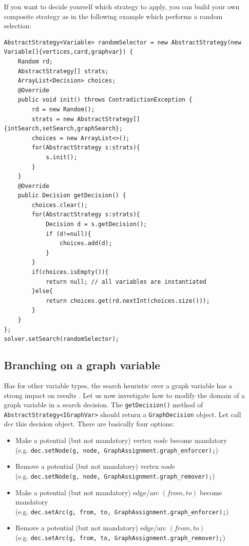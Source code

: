 \documentclass{article}
\begin{document}
If you want to decide yourself which strategy to apply, you can build your own composite strategy as in the following example which performs a random selection:

\begin{lstlisting}
AbstractStrategy<Variable> randomSelector = new AbstractStrategy(new Variable[]{vertices,card,graphvar}) {
	Random rd;
	AbstractStrategy[] strats;
	ArrayList<Decision> choices;
	@Override
	public void init() throws ContradictionException {
		rd = new Random();
		strats = new AbstractStrategy[]{intSearch,setSearch,graphSearch};
		choices = new ArrayList<>();
		for(AbstractStrategy s:strats){
			s.init();
		}
	}
	@Override
	public Decision getDecision() {
		choices.clear();
		for(AbstractStrategy s:strats){
			Decision d = s.getDecision();
			if (d!=null){
				choices.add(d);
			}
		}
		if(choices.isEmpty()){
			return null; // all variables are instantiated
		}else{
			return choices.get(rd.nextInt(choices.size()));
		}
	}
};
solver.setSearch(randomSelector);
\end{lstlisting}

\subsection{Branching on a graph variable}

Has for other variable types, the search heuristic over a graph variable has a strong impact on results \cite{GraphSearch}. 
Let us now investigate how to modify the domain of a graph variable in a search decision. 
The \texttt{getDecision()} method of \texttt{AbstractStrategy<IGraphVar>} should return a \texttt{GraphDecision} object. Let call $dec$ this decision object. 
There are basically four options:
\begin{itemize} 
\item Make a potential (but not mandatory) vertex $node$ become mandatory \\ 
(e.g. \texttt{dec.setNode(g, node, GraphAssignment.graph\_enforcer);})
\item Remove a potential (but not mandatory) vertex $node$ \\ 
(e.g. \texttt{dec.setNode(g, node, GraphAssignment.graph\_remover);})
\item Make a potential (but not mandatory) edge/arc $(from,to)$ become mandatory \\ 
(e.g. \texttt{dec.setArc(g, from, to, GraphAssignment.graph\_enforcer);})
\item Remove a potential (but not mandatory) edge/arc $(from,to)$ \\ 
(e.g. \texttt{dec.setArc(g, from, to, GraphAssignment.graph\_remover);})
\end{itemize}
\end{document}
